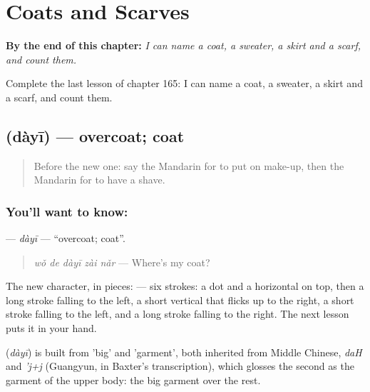 
\chapter{Coats and Scarves}
\label{ch:zh-coats-and-scarves}

\begin{chapteropening}
\textbf{By the end of this chapter:} \emph{I can name a coat, a sweater, a skirt and a scarf, and count them.}

Complete the last lesson of chapter 165: I can name a coat, a sweater, a skirt and a scarf, and count them.
\end{chapteropening}

\section[\texorpdfstring{\zh{大衣} (dàyī)}{大衣 (dàyī)}]{ (dàyī) — overcoat; coat}

\label{lesson:ZH-C165-dayi}



\begin{quote}
Before the new one: say the Mandarin for to put on make-up, then the Mandarin for to have a shave.
\end{quote}

\subsection*{You'll want to know: }
\textbf{} — \emph{dàyī} — \textquotedblleft{}overcoat; coat\textquotedblright{}.

\begin{quote}
\textbf{} \emph{wǒ de dàyī zài nǎr} — Where's my coat?
\end{quote}

The new character, in pieces:  — six strokes: a dot and a horizontal on top, then a long stroke falling to the left, a short vertical that flicks up to the right, a short stroke falling to the left, and a long stroke falling to the right. The next lesson puts it in your hand.

\begin{cousinweb}
\textbf{} (\emph{dàyī}) is built from  'big' and  'garment', both inherited from Middle Chinese, \emph{daH} and \emph{'j+j} (Guangyun, in Baxter's transcription), which glosses the second as the garment of the upper body: the big garment over the rest.
\end{cousinweb}

